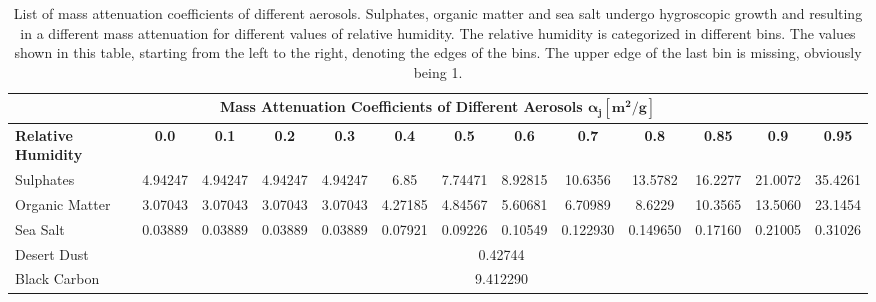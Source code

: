 \begin{landscape}
    \renewcommand{\arraystretch}{1.5}
    \begin{table}[H]
    \begin{adjustbox}{width=1.5\textwidth,center}
        \begin{tabular}{|l|c|c|c|c|c|c|c|c|c|c|c|c|}
        \hline 
        \multicolumn{13}{|c|}{  \textbf{Mass Attenuation Coefficients of Different Aerosols } $\boldsymbol{\alpha_{j} [m^2/g]}$ }\\
        \hline 
         \textbf{Relative Humidity} &\textbf{0.0}&\textbf{0.1}&\textbf{0.2}&\textbf{0.3}&\textbf{0.4}&\textbf{0.5}&\textbf{0.6}&\textbf{0.7}&\textbf{0.8}&\textbf{0.85}&\textbf{0.9}&\textbf{0.95}\\
        \hline 
        Sulphates&4.94247&4.94247&4.94247&4.94247&6.85&7.74471&8.92815&10.6356&13.5782&16.2277&21.0072&35.4261 \\
        \hline
        Organic Matter&3.07043&3.07043&3.07043&3.07043&4.27185&4.84567&5.60681&6.70989&8.6229&10.3565&13.5060&23.1454\\
        \hline
        Sea Salt&0.03889&0.03889&0.03889&0.03889&0.07921&0.09226&0.10549&0.122930&0.149650&0.17160&0.21005&0.31026 \\
        \hline
        Desert Dust& \multicolumn{12}{c|}{0.42744}\\
        \hline
        Black Carbon &  \multicolumn{12}{c|}{9.412290}\\
        \hline
        \end{tabular}
    \end{adjustbox}
    \caption{List of mass attenuation coefficients of different aerosols. Sulphates, organic matter and sea salt undergo hygroscopic growth and resulting in a different mass attenuation for different values of relative humidity. The relative humidity is categorized in different bins. The values shown in this table, starting from the left to the right, denoting the edges of the bins. The upper edge of the last bin is missing, obviously being 1. } \label{tab:absorption}
    \end{table}

\end{landscape}

